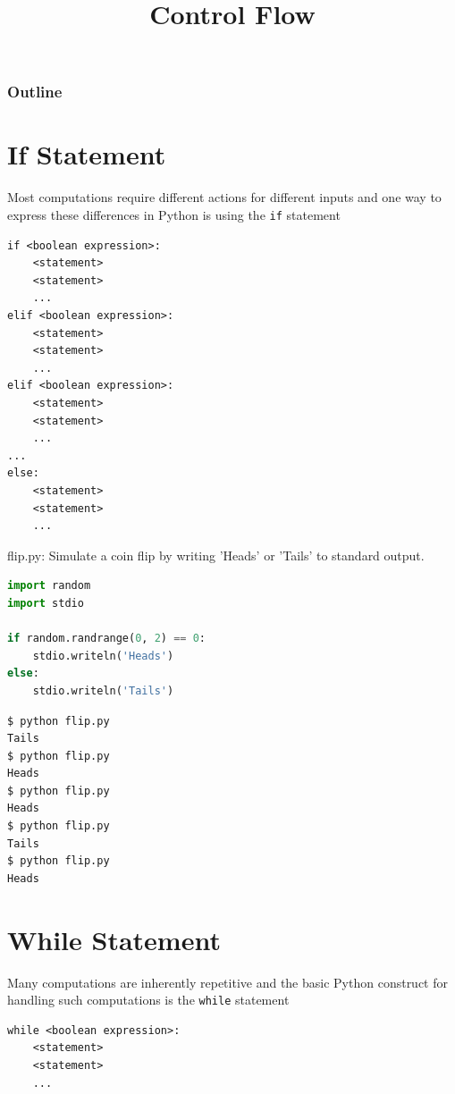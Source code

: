 \documentclass[8pt,a4paper,compress]{beamer}
\title{Control Flow}
\date{}
\begin{document}
\begin{frame}
\vfill
\titlepage
\end{frame}

\begin{frame}
\frametitle{Outline}
\tableofcontents
\end{frame}

\section{If Statement}
\begin{frame}[fragile]
\pause

Most computations require different actions for different inputs and one way to express these differences in Python is using the \lstinline{if} statement

\pause
\smallskip

\begin{lstlisting}[language={}]
if <boolean expression>:
    <statement>
    <statement>
    ...
elif <boolean expression>:
    <statement>
    <statement>
    ...
elif <boolean expression>:
    <statement>
    <statement>
    ...
...
else: 
    <statement>
    <statement>
    ...
\end{lstlisting}
\end{frame}

\begin{frame}[fragile]
\pause

\begin{framed}
\tiny flip.py: Simulate a coin flip by writing 'Heads' or 'Tails' to standard output.
\end{framed}

\begin{lstlisting}[language=Python]
import random
import stdio

if random.randrange(0, 2) == 0:
    stdio.writeln('Heads')
else:
    stdio.writeln('Tails')
\end{lstlisting}

\pause

\begin{lstlisting}[language={}]
$ python flip.py 
Tails
$ python flip.py 
Heads
$ python flip.py 
Heads
$ python flip.py 
Tails
$ python flip.py 
Heads
\end{lstlisting}
\end{frame}

\section{While Statement}
\begin{frame}[fragile]
\pause

Many computations are inherently repetitive and the basic Python construct for handling such computations is the \lstinline{while} statement

\pause
\smallskip

\begin{lstlisting}[language={}]
while <boolean expression>:
    <statement>
    <statement>
    ...
\end{lstlisting}
\end{frame}
\end{document}
